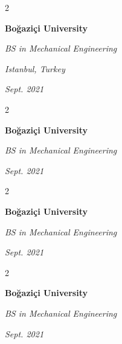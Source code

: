 \documentclass[10pt, letterpaper]{article}
\newenvironment{twocolentry}[2][]{
    \onecolentry
    \def\secondColumn{#2}
    \setcolumnwidth{\fill, 4.5 cm}
    \begin{paracol}{2}
}{
    \switchcolumn \raggedleft \secondColumn
    \end{paracol}
    \endonecolentry
} %
\begin{document}
        \vspace{0.2 cm-3px}

        \begin{twocolentry}{
        \textit{Istanbul, Turkey}    
            
        \textit{Sept. 2021}}
            \textbf{Boğaziçi University}

            \textit{BS in Mechanical Engineering}
        \end{twocolentry}



        \vspace{0.2 cm-3px}

        \begin{twocolentry}{
            
            
        \textit{Sept. 2021}}
            \textbf{Boğaziçi University}

            \textit{BS in Mechanical Engineering}
        \end{twocolentry}



        \vspace{0.2 cm-3px}

        \begin{twocolentry}{
            
            
        \textit{Sept. 2021}}
            \textbf{Boğaziçi University}

            \textit{BS in Mechanical Engineering}
        \end{twocolentry}



        \vspace{0.2 cm-3px}

        \begin{twocolentry}{
            
            
        \textit{Sept. 2021}}
            \textbf{Boğaziçi University}

            \textit{BS in Mechanical Engineering}
        \end{twocolentry}
\end{document}
